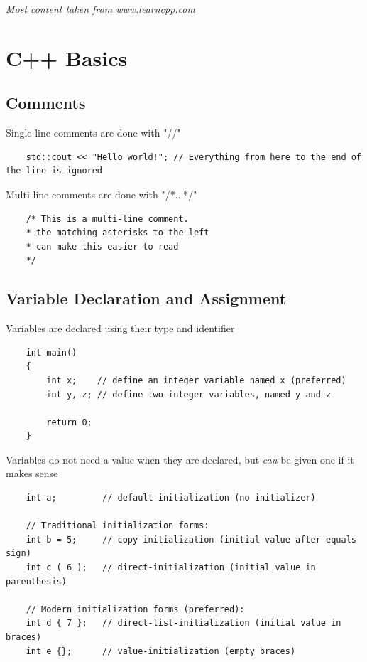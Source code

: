 \documentclass[]{article}
\begin{document}
\maketitle
\begin{center}
\emph{Most content taken from \url{www.learncpp.com}}
\end{center}
\tableofcontents

\section{C++ Basics}

\subsection{Comments}

Single line comments are done with "//"
\begin{verbatim}
	std::cout << "Hello world!"; // Everything from here to the end of the line is ignored
\end{verbatim}
Multi-line comments are done with "/*...*/"
\begin{verbatim}
	/* This is a multi-line comment.
	* the matching asterisks to the left
	* can make this easier to read
	*/
\end{verbatim}

\subsection{Variable Declaration and Assignment}

Variables are declared using their type and identifier
\begin{verbatim}
	int main()
	{
		int x;    // define an integer variable named x (preferred)
		int y, z; // define two integer variables, named y and z
		
		return 0;
	}
\end{verbatim}
Variables do not need a value when they are declared, but \textit{can} be given one if it makes sense

\begin{verbatim}
	int a;         // default-initialization (no initializer)
	
	// Traditional initialization forms:
	int b = 5;     // copy-initialization (initial value after equals sign)
	int c ( 6 );   // direct-initialization (initial value in parenthesis)
	
	// Modern initialization forms (preferred):
	int d { 7 };   // direct-list-initialization (initial value in braces)
	int e {};      // value-initialization (empty braces)
\end{verbatim}
\end{document}
